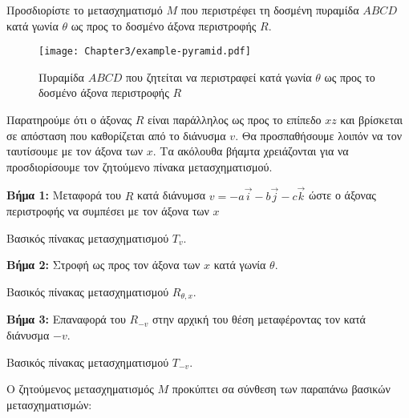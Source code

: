 \begin{example}
Προσδιορίστε το μετασχηματισμό $M$ που περιστρέφει τη δοσμένη πυραμίδα $ABCD$ κατά γωνία $\theta$ ως προς το δοσμένο άξονα περιστροφής $R$.

		\begin{figure}[hbt]
		\begin{center}
		\texttt{[image: Chapter3/example-pyramid.pdf]}
		\end{center}
		\caption{Πυραμίδα $ABCD$ που ζητείται να περιστραφεί κατά γωνία $\theta$ ως προς το δοσμένο άξονα περιστροφής $R$}
		\end{figure}

\end{example}

\begin{solution}
	Παρατηρούμε ότι ο άξονας $R$ είναι παράλληλος ως προς το επίπεδο $xz$ και βρίσκεται σε απόσταση που καθορίζεται από το διάνυσμα $v$. Θα προσπαθήσουμε λοιπόν να τον ταυτίσουμε με τον άξονα των $x$. Τα ακόλουθα βήαμτα χρειάζονται για να προσδιορίσουμε τον ζητούμενο πίνακα μετασχηματισμού.

\textbf{Βήμα 1:} Μεταφορά του $R$ κατά διάνυμσα $v = -a\vec{i} - b\vec{j} - c\vec{k}$ ώστε ο άξονας περιστροφής να συμπέσει με τον άξονα των $x$

Βασικός πίνακας μετασχηματισμού $T_v$.

\textbf{Βήμα 2:} Στροφή ως προς τον άξονα των $x$ κατά γωνία $\theta$. 

Βασικός πίνακας μετασχηματισμού $R_{\theta, x}$.
 
\textbf{Βήμα 3:} Επαναφορά του $R_{-v}$ στην αρχική του θέση μεταφέροντας τον κατά διάνυσμα $-v$.

Βασικός πίνακας μετασχηματισμού $T_{-v}$.

Ο ζητούμενος μετασχηματισμός $M$ προκύπτει σα σύνθεση των παραπάνω βασικών μετασχηματισμών:


\end{solution}
